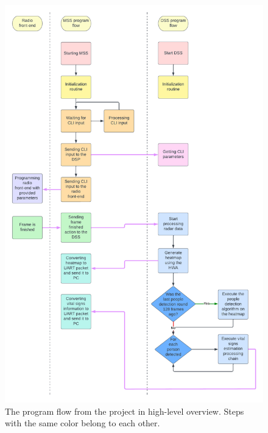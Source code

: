 \begin{figure}[t]
\centering
\includegraphics[width=.95\textwidth]{figures/realtime_implementation/Program flow.pdf}
\caption{The program flow from the project in high-level overview. Steps with the same color belong to each other.}
\label{fig:program_flow}
\end{figure}
